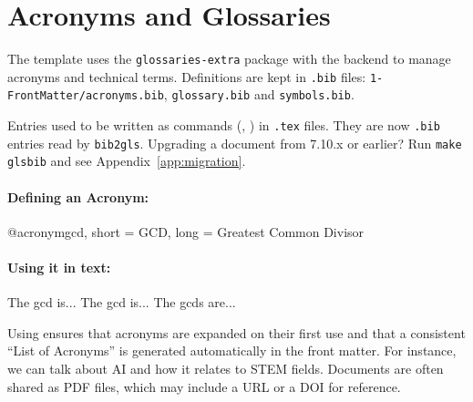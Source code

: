 \section{Acronyms and Glossaries}
\label{sec:acronyms_and_glossaries}

The \novathesis{} template uses the \texttt{glossaries-extra} package with the
 backend to manage acronyms and
technical terms.  Definitions are kept in \texttt{.bib} files:
\texttt{1-FrontMatter/acronyms.bib}, \texttt{glossary.bib} and
\texttt{symbols.bib}.

\begin{warningbox}[title={Changed in 8.0: glossary entries are now
                          \texttt{.bib} files}]
  Entries used to be written as  commands
  (\latexinline{\newacronym}, \latexinline{\newglossaryentry}) in
  \texttt{.tex} files.  They are now \texttt{.bib} entries read by
  \texttt{bib2gls}.  Upgrading a document from 7.10.x or earlier?  Run
  \verb!make glsbib! and see Appendix~\ref{app:migration}.
\end{warningbox}

\paragraph{Defining an Acronym:}
\begin{latexcode}
@acronym{gcd,
  short = {GCD},
  long  = {Greatest Common Divisor}
}
\end{latexcode}

\paragraph{Using it in text:}
\begin{latexcode}
The \gls{gcd} is...  %
The \gls{gcd} is...  %
The \glspl{gcd} are... %
\end{latexcode}

Using \latexinline{\gls} ensures that acronyms are expanded on their first use and that a consistent “List of Acronyms” is generated automatically in the front matter. For instance, we can talk about \gls{AI} and how it relates to \gls{STEM} fields. Documents are often shared as \gls{PDF} files, which may include a \gls{URL} or a \gls{DOI} for reference.

